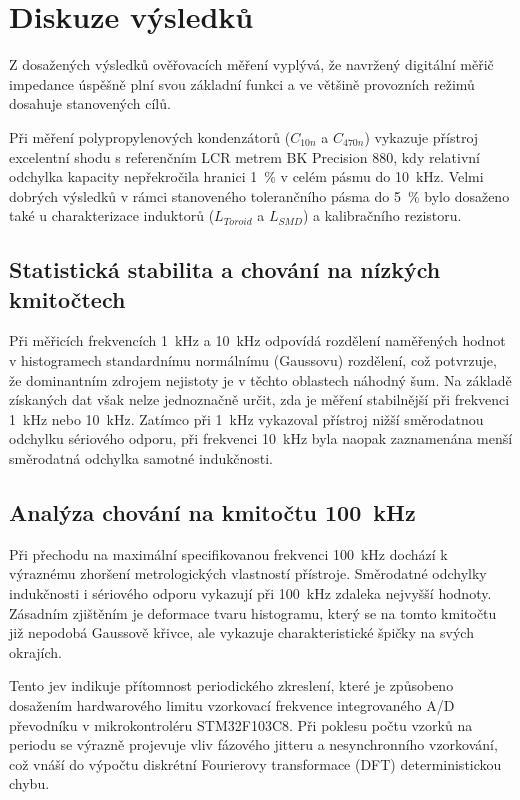\section{Diskuze výsledků}

Z dosažených výsledků ověřovacích měření vyplývá, že navržený digitální měřič impedance úspěšně plní svou základní funkci a ve většině provozních režimů dosahuje stanovených cílů. 

Při měření polypropylenových kondenzátorů ($C_{10n}$ a $C_{470n}$) vykazuje přístroj excelentní shodu s referenčním LCR metrem BK Precision 880, kdy relativní odchylka kapacity nepřekročila hranici 1~\% v celém pásmu do 10~kHz. Velmi dobrých výsledků v rámci stanoveného tolerančního pásma do 5~\% bylo dosaženo také u charakterizace induktorů ($L_{Toroid}$ a $L_{SMD}$) a kalibračního rezistoru.

\subsection{Statistická stabilita a chování na nízkých kmitočtech}
Při měřicích frekvencích 1~kHz a 10~kHz odpovídá rozdělení naměřených hodnot v histogramech standardnímu normálnímu (Gaussovu) rozdělení, což potvrzuje, že dominantním zdrojem nejistoty je v těchto oblastech náhodný šum. Na základě získaných dat však nelze jednoznačně určit, zda je měření stabilnější při frekvenci 1~kHz nebo 10~kHz. Zatímco při 1~kHz vykazoval přístroj nižší směrodatnou odchylku sériového odporu, při frekvenci 10~kHz byla naopak zaznamenána menší směrodatná odchylka samotné indukčnosti.

\subsection{Analýza chování na kmitočtu 100~kHz}
Při přechodu na maximální specifikovanou frekvenci 100~kHz dochází k výraznému zhoršení metrologických vlastností přístroje. Směrodatné odchylky indukčnosti i sériového odporu vykazují při 100~kHz zdaleka nejvyšší hodnoty. Zásadním zjištěním je deformace tvaru histogramu, který se na tomto kmitočtu již nepodobá Gaussově křivce, ale vykazuje charakteristické špičky na svých okrajích. 

Tento jev indikuje přítomnost periodického zkreslení, které je způsobeno dosažením hardwarového limitu vzorkovací frekvence integrovaného A/D převodníku v mikrokontroléru STM32F103C8. Při poklesu počtu vzorků na periodu se výrazně projevuje vliv fázového jitteru a nesynchronního vzorkování, což vnáší do výpočtu diskrétní Fourierovy transformace (DFT) deterministickou chybu.

